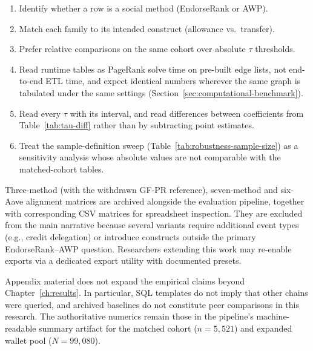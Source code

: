 \begin{enumerate}
\item Identify whether a row is a social method (EndorseRank or AWP).
\item Match each family to its intended construct (allowance vs.\ transfer).
\item Prefer relative comparisons on the same cohort over absolute $\tau$ thresholds.
\item Read runtime tables as PageRank solve time on pre-built edge lists, not end-to-end ETL time, and expect identical numbers wherever the same graph is tabulated under the same settings (Section~\ref{sec:computational-benchmark}).
\item Read every $\tau$ with its interval, and read differences between coefficients from Table~\ref{tab:tau-diff} rather than by subtracting point estimates.
\item Treat the sample-definition sweep (Table~\ref{tab:robustness-sample-size}) as a sensitivity analysis whose absolute values are not comparable with the matched-cohort tables.
\end{enumerate}


Three-method (with the withdrawn GF-PR reference), seven-method and six-Aave alignment matrices are archived alongside the evaluation pipeline, together with corresponding CSV matrices for spreadsheet inspection. They are excluded from the main narrative because several variants require additional event types (e.g., credit delegation) or introduce constructs outside the primary EndorseRank--AWP question. Researchers extending this work may re-enable exports via a dedicated export utility with documented presets.


Appendix material does not expand the empirical claims beyond Chapter~\ref{ch:results}. In particular, SQL templates do not imply that other chains were queried, and archived baselines do not constitute peer comparisons in this research. The authoritative numerics remain those in the pipeline's machine-readable summary artifact for the matched cohort ($n=5{,}521$) and expanded wallet pool ($N=99{,}080$).
